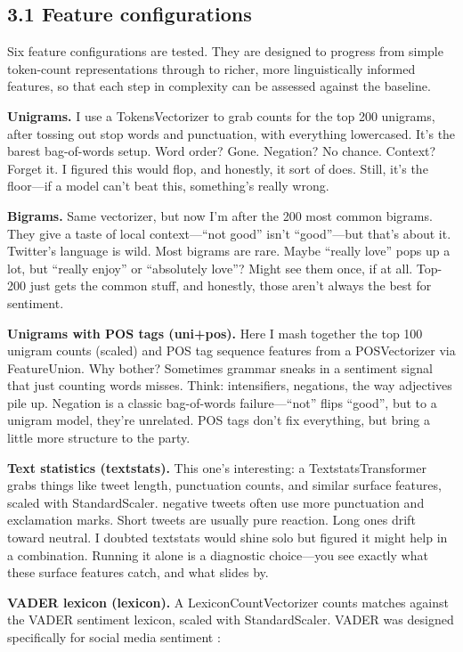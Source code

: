 \documentclass[12pt]{article}
\begin{document}
\subsection*{3.1 Feature configurations}



Six feature configurations are tested. They are designed to progress from simple token-count representations through to richer, more linguistically informed features, so that each step in complexity can be assessed against the baseline.

\textbf{Unigrams.} I use a TokensVectorizer to grab counts for the top 200 unigrams, after tossing out stop words and punctuation, with everything lowercased. It's the barest bag-of-words setup. Word order? Gone. Negation? No chance. Context? Forget it. I figured this would flop, and honestly, it sort of does. Still, it's the floor---if a model can't beat this, something's really wrong.

\textbf{Bigrams.} Same vectorizer, but now I'm after the 200 most common bigrams. They give a taste of local context---``not good'' isn't ``good''---but that's about it. Twitter's language is wild. Most bigrams are rare. Maybe ``really love'' pops up a lot, but ``really enjoy'' or ``absolutely love''? Might see them once, if at all. Top-200 just gets the common stuff, and honestly, those aren't always the best for sentiment.

\textbf{Unigrams with POS tags (uni+pos).} Here I mash together the top 100 unigram counts (scaled) and POS tag sequence features from a POSVectorizer via FeatureUnion. Why bother? Sometimes grammar sneaks in a sentiment signal that just counting words misses. Think: intensifiers, negations, the way adjectives pile up. Negation is a classic bag-of-words failure---``not'' flips ``good'', but to a unigram model, they're unrelated. POS tags don't fix everything, but bring a little more structure to the party.

\textbf{Text statistics (textstats).} This one's interesting: a TextstatsTransformer grabs things like tweet length, punctuation counts, and similar surface features, scaled with StandardScaler. negative tweets often use more punctuation and exclamation marks. Short tweets are usually pure reaction. Long ones drift toward neutral. I doubted textstats would shine solo but figured it might help in a combination. Running it alone is a diagnostic choice---you see exactly what these surface features catch, and what slides by.

\textbf{VADER lexicon (lexicon).} A LexiconCountVectorizer counts matches against the VADER sentiment lexicon, scaled with StandardScaler. VADER was designed specifically for social media sentiment \citep{hutto2014vader}:
\end{document}
